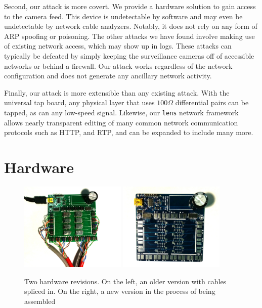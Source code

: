 \documentclass[12pt,notitlepage]{article}
\begin{document}
Second, our attack is more covert. We provide a hardware solution to gain access to the camera feed. This device is undetectable by software and may even be undetectable by network cable analyzers. Notably, it does not rely on any form of ARP spoofing or poisoning. The other attacks we have found involve making use of existing network access, which may show up in logs. These attacks can typically be defeated by simply keeping the surveillance cameras off of accessible networks or behind a firewall. Our attack works regardless of the network configuration and does not generate any ancillary network activity. 

Finally, our attack is more extensible than any existing attack. With the universal tap board, any physical layer that uses $100\Omega$ differential pairs can be tapped, as can any low-speed signal. Likewise, our \texttt{lens} network framework allows nearly transparent editing of many common network communication protocols such as HTTP, and RTP, and can be expanded to include many more.

\section{Hardware}

\begin{figure}[h]
    \centering
    \includegraphics[width=0.45\textwidth]{hwphoto1}
    \includegraphics[width=0.45\textwidth]{hwphoto2}
    \caption{Two hardware revisions. On the left, an older version with cables spliced in. On the right, a new version in the process of being assembled}
\end{figure}
\end{document}

